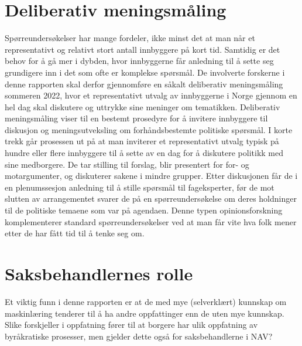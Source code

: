 \documentclass[
]{book}
\begin{document}
\hypertarget{deliberativ-meningsmuxe5ling}{%
\section{Deliberativ meningsmåling}\label{deliberativ-meningsmuxe5ling}}

Spørreundersøkelser har mange fordeler, ikke minst det at man når et representativt og relativt stort antall innbyggere på kort tid.
Samtidig er det behov for å gå mer i dybden, hvor innbyggerne får anledning til å sette seg grundigere inn i det som ofte er komplekse spørsmål.
De involverte forskerne i denne rapporten skal derfor gjennomføre en såkalt deliberativ meningsmåling sommeren 2022, hvor et representativt utvalg av innbyggerne i Norge gjennom en hel dag skal diskutere og uttrykke sine meninger om tematikken.
Deliberativ meningsmåling viser til en bestemt prosedyre for å invitere innbyggere til diskusjon og meningsutveksling om forhåndsbestemte politiske spørsmål.
I korte trekk går prosessen ut på at man inviterer et representativt utvalg typisk på hundre eller flere innbyggere til å sette av en dag for å diskutere politikk med sine medborgere.
De tar stilling til forslag, blir presentert for for- og motargumenter, og diskuterer sakene i mindre grupper.
Etter diskusjonen får de i en plenumssesjon anledning til å stille spørsmål til fageksperter, før de mot slutten av arrangementet svarer de på en spørreundersøkelse om deres holdninger til de politiske temaene som var på agendaen.
Denne typen opinionsforskning komplementerer standard spørreundersøkelser ved at man får vite hva folk mener etter de har fått tid til å tenke seg om.

\hypertarget{saksbehandlernes-rolle}{%
\section{Saksbehandlernes rolle}\label{saksbehandlernes-rolle}}

Et viktig funn i denne rapporten er at de med mye (selverklært) kunnskap om maskinlæring tenderer til å ha andre oppfattinger enn de uten mye kunnskap.
Slike forskjeller i oppfatning fører til at borgere har ulik oppfatning av byråkratiske prosesser, men gjelder dette også for saksbehandlerne i NAV?
\end{document}
